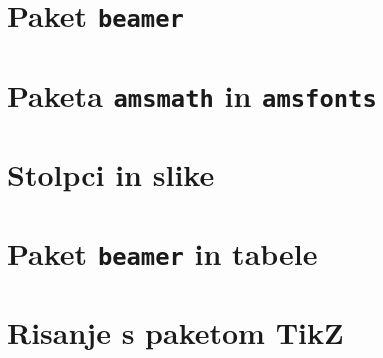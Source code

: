 \documentclass{beamer}
\begin{document}


\section{Paket \texttt{beamer}}


\section{Paketa \texttt{amsmath} in \texttt{amsfonts}}

\section{Stolpci in slike}

\section{Paket \texttt{beamer} in tabele}

\section{Risanje s paketom TikZ}

\end{document}
